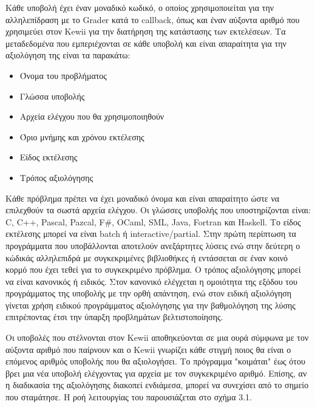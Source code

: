 \documentclass[diploma]{softlab-thesis}
\begin{document}
\bigskip

Κάθε υποβολή έχει έναν μοναδικό κωδικό, ο οποίος χρησιμοποιείται για την
αλληλεπίδραση με το Grader κατά το callback, όπως και έναν αύξοντα αριθμό που
χρησιμεύει στον Kewii για την διατήρηση της κατάστασης των εκτελέσεων. Τα
μεταδεδομένα που εμπεριέχονται σε κάθε υποβολή και είναι απαραίτητα για την
αξιολόγηση της είναι τα παρακάτω:

\begin{itemize}
  \item Όνομα του προβλήματος
  \item Γλώσσα υποβολής
  \item Αρχεία ελέγχου που θα χρησιμοποιηθούν
  \item Όριο μνήμης και χρόνου εκτέλεσης
  \item Είδος εκτέλεσης
  \item Τρόπος αξιολόγησης
\end{itemize}

Κάθε πρόβλημα πρέπει να έχει μοναδικό όνομα και είναι απαραίτητο ώστε να
επιλεχθούν τα σωστά αρχεία ελέγχου. Οι γλώσσες υποβολής που υποστηρίζονται
είναι: C, C++, Pascal, Pazcal, F\#, OCaml, SML, Java, Fortran και Haskell. Το
είδος εκτέλεσης μπορεί να είναι batch ή interactive/partial. Στην πρώτη
περίπτωση τα προγράμματα που υποβάλλονται αποτελούν ανεξάρτητες λύσεις ενώ στην
δεύτερη ο κώδικάς αλληλεπιδρά με συγκεκριμένες βιβλιοθήκες ή εντάσσεται σε έναν
κοινό κορμό που έχει τεθεί για το συγκεκριμένο πρόβλημα. Ο τρόπος αξιολόγησης
μπορεί να είναι κανονικός ή ειδικός. Στον κανονικό ελέγχεται η ομοιότητα της
εξόδου του προγράμματος της υποβολής με την ορθή απάντηση, ενώ στον ειδική
αξιολόγηση γίνεται χρήση ειδικού προγράμματος αξιολόγησης για την βαθμολόγηση
της λύσης επιτρέποντας έτσι την ύπαρξη προβλημάτων βελτιστοποίησης.

\bigskip

Οι υποβολές που στέλνονται στον Kewii αποθηκεύονται σε μια ουρά σύμφωνα με τον
αύξοντα αριθμό που παίρνουν και ο Kewii γνωρίζει κάθε στιγμή ποιος θα είναι ο
επόμενος αριθμός υποβολής που θα αξιολογήσει. Το πρόγραμμα "κοιμάται" έως ότου
βρει μια νέα υποβολή ελέγχοντας για αρχεία με τον συγκεκριμένο αριθμό. Επίσης,
αν η διαδικασία της αξιολόγησης διακοπεί ενδιάμεσα, μπορεί να συνεχίσει από το
σημείο που σταμάτησε. Η ροή λειτουργίας του παρουσιάζεται στο σχήμα 3.1.
\end{document}
